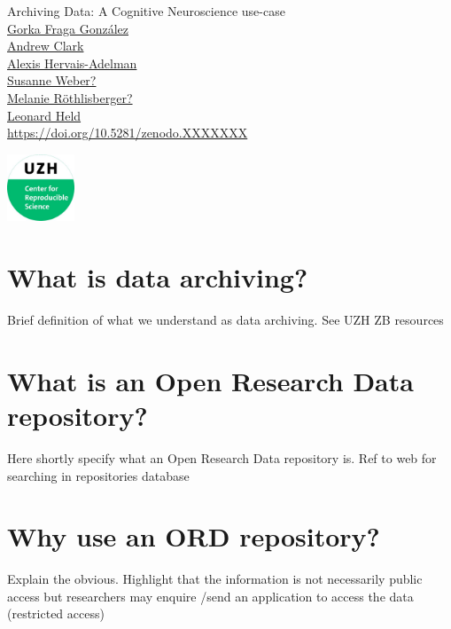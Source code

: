 \documentclass[a4paper,11pt]{report}
\renewcommand\url[1]{{\href{#1}{#1}}}
\begin{document}
\begin{minipage}{\textwidth}
    {\Huge \textcolor{swissRNblue}{Archiving Data: A Cognitive Neuroscience use-case}} \\[0.5ex]
    \href{https://orcid.org/0000-0002-1857-8607}{Gorka Fraga González}\\
    \href{https://orcid.org/xxxx}{Andrew Clark}\\
    \href{https://orcid.org/xxxx}{Alexis Hervais-Adelman }\\    
    \href{https://orcid.org/xxxx}{Susanne Weber?}\\
    \href{https://orcid.org/xxxx}{Melanie Röthlisberger?}\\    
    \href{https://orcid.org/xxxx}{Leonard Held}\\
    \url{https://doi.org/10.5281/zenodo.XXXXXXX}
\end{minipage}%
\begin{minipage}{0.02\textwidth}
    \centering
    \includegraphics[height=2cm]{CRS.jpg}
\end{minipage}%


\section*{What is data archiving?}
Brief definition of what we understand as data archiving. See UZH ZB resources 

\section*{What is an Open Research Data repository?}
Here shortly specify what an Open Research Data repository is. Ref to web for searching in repositories database 

\section*{Why use an ORD repository?}
Explain the obvious. Highlight that the information is not necessarily public access but researchers may enquire /send an application to access the data (restricted access)
\end{document}
